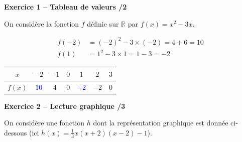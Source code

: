 \documentclass[10pt,a4paper]{article}
\begin{document}
\textbf{Exercice 1 -- Tableau de valeurs \hfill /2}

On considère la fonction \(f\) définie sur \(\mathbb{R}\) par \(f(x)=x^2-3x\).

\[
\begin{aligned}
f(-2) &= (-2)^2-3\times(-2) = 4+6 = 10\\
f(1)  &= 1^2-3\times 1 = 1-3 = -2
\end{aligned}
\]

\begin{center}
    \renewcommand{\arraystretch}{1.5}
    \setlength{\tabcolsep}{0.25cm}
    \begin{tabular}{|*{7}{c|}}
    \hline
    \(x\) & \(-2\) & \(-1\) & \(0\) & \(1\) & \(2\) & \(3\) \\
    \hline
    \(f(x)\) & \textcolor{blue}{\(10\)} & \(4\) & \(0\) & \textcolor{blue}{\(-2\)} & \(-2\) & \(0\) \\
    \hline
    \end{tabular}
\end{center}

\textbf{Exercice 2 -- Lecture graphique \hfill /3}

On considère une fonction \(h\) dont la représentation graphique est donnée ci-dessous (ici \(h(x)=\frac{1}{3}x(x+2)(x-2)-1\)).

\begin{center}
\end{center}
\end{document}
